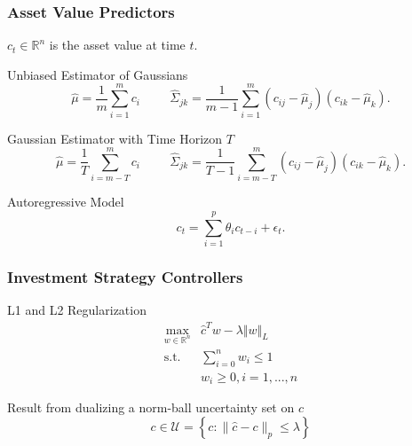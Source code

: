 \documentclass{beamer}
\begin{document}
\begin{frame}
\frametitle{Asset Value Predictors}

    $c_t \in \mathbb{R}^n$ is the asset value at time $t$.

    \begin{block}{Unbiased Estimator of Gaussians}
    \[ \hat{\mu} = \frac{1}{m} \sum_{i=1}^{m} c_i \hspace{1cm} \hat{\Sigma}_{jk} = \frac{1}{m-1} \sum_{i=1}^{m} (c_{ij} - \hat{\mu}_j)(c_{ik} - \hat{\mu}_k). \]
    \end{block}

    \begin{block}{Gaussian Estimator with Time Horizon $T$}
    \[ \hat{\mu} = \frac{1}{T} \sum_{i=m-T}^{m} c_i \hspace{1cm} \hat{\Sigma}_{jk} = \frac{1}{T-1} \sum_{i=m-T}^{m} (c_{ij} - \hat{\mu}_j)(c_{ik} - \hat{\mu}_k). \]
    \end{block}

    \begin{block}{Autoregressive Model}
    \[ c_t = \sum_{i=1}^p \theta_i c_{t-i} + \epsilon_t. \]
    \end{block}

\end{frame}

\begin{frame}
\frametitle{Investment Strategy Controllers}

    \begin{block}{L1 and L2 Regularization}
    \begin{align*}
        \max_{w\in\mathbb{R}^n}{} & \hat{c}^T w - \lambda \Vert w \Vert_L \\
        \mbox{s.t.} & \sum_{i=0}^{n} w_i \leq 1 \\
        & w_i \geq 0, i=1,...,n
    \end{align*}
    \end{block}

    \begin{center}
        Result from dualizing a norm-ball uncertainty set on $c$ \\
        \[ c \in \mathcal{U}=\left\{ c : \|\hat{c} - c\|_p \leq \lambda \right\} \]
    \end{center}

\end{frame}
\end{document}
